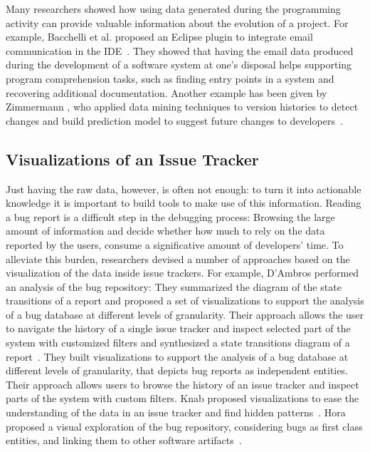 Many researchers showed how using data generated during the programming activity can provide valuable information about the evolution of a project.
For example, Bacchelli et al. proposed an Eclipse plugin to integrate email communication in the IDE~\cite{Bacc2011a}.
They showed that having the email data produced during the development of a software system at one's disposal helps supporting program comprehension tasks, such as finding entry points in a system and recovering additional documentation.
Another example has been given by Zimmermann \etal, who applied data mining techniques to version histories to detect changes and build prediction model to suggest future changes to developers~\cite{Zimm2004a}.


\subsection{Visualizations of an Issue Tracker}

Just having the raw data, however, is often not enough: to turn it into actionable knowledge it is important to build tools to make use of this information.
Reading a bug report is a difficult step in the debugging process: Browsing the large amount of information and decide whether how much to rely on the data reported by the users, consume a significative amount of developers' time.
To alleviate this burden, researchers devised a number of approaches based on the visualization of the data inside issue trackers.
For example, D'Ambros \etal performed an analysis of the \bzilla bug repository: They summarized the diagram of the state transitions of a report and proposed a set of visualizations to support the analysis of a bug database at different levels of granularity.
Their approach allows the user to navigate the history of a single issue tracker and inspect selected part of the system with customized filters and synthesized a state transitions diagram of a report~\cite{DAmb2007b}.
They built visualizations to support the analysis of a bug database at different levels of granularity, that depicts bug reports as independent entities.
Their approach allows users to browse the history of an issue tracker and inspect parts of the system with custom filters.
Knab \etal proposed visualizations to ease the understanding of the data in an issue tracker and find hidden patterns~\cite{Knab2009a,Knab2010a}.
Hora \etal proposed a visual exploration of the bug repository, considering bugs as first class entities, and linking them to other software artifacts~\cite{Hora2012a}.

